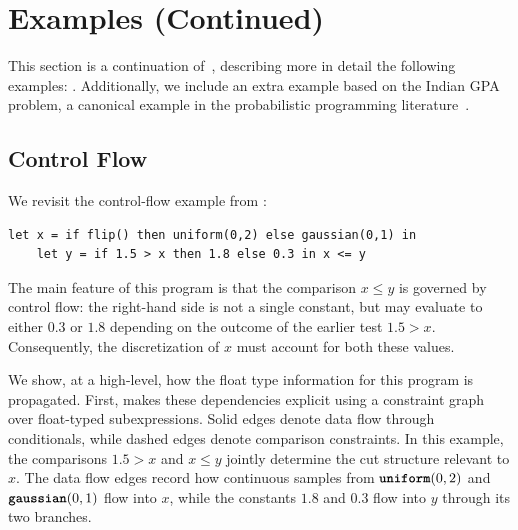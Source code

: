 \clearpage
\appendix
\tableofcontents

\section{\Slicebf{} Examples (Continued)}\label{ap:mot}
This section is a continuation of~, describing more in detail the following examples: . Additionally, we include an extra example based on the Indian GPA problem, a canonical example in the probabilistic programming literature~\cite{Wu2018DiscreteContinuousMixtures}.

\subsection{Control Flow}\label{app:examples:4}

We revisit the control-flow example from :
\begin{lstlisting}[aboveskip=1em,belowskip=1em,escapechar=!,gobble=4]
    let x = if flip() then uniform(0,2) else gaussian(0,1) in
    let y = if 1.5 > x then 1.8 else 0.3 in x <= y
\end{lstlisting}
The main feature of this program is that the comparison $x \leq y$ is governed by control flow: the right-hand side is not a single constant, but may evaluate to either $0.3$ or $1.8$ depending on the outcome of the earlier test $1.5 > x$. Consequently, the discretization of $x$ must account for both these values.



We show, at a high-level, how the float type information for this program is propagated. First,  makes these dependencies explicit using a constraint graph over float-typed subexpressions. Solid edges denote data flow through conditionals, while dashed edges denote comparison constraints. In this example, the comparisons $1.5 > x$ and $x \leq y$ jointly determine the cut structure relevant to $x$. The data flow edges record how continuous samples from $\textnormal{\ttfamily\bfseries uniform}(0,2)$ and $\textnormal{\ttfamily\bfseries gaussian}(0,1)$ flow into $x$, while the constants $1.8$ and $0.3$ flow into $y$ through its two branches.



